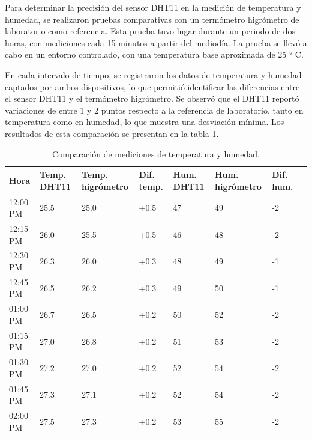 Para determinar la precisión del sensor DHT11 en la medición de temperatura y humedad, se realizaron pruebas comparativas con un termómetro higrómetro de laboratorio como referencia. Esta prueba tuvo lugar durante un periodo de dos horas, con mediciones cada 15 minutos a partir del mediodía. La prueba se llevó a cabo en un entorno controlado, con una temperatura base aproximada de 25 ° C.

En cada intervalo de tiempo, se registraron los datos de temperatura y humedad captados por ambos dispositivos, lo que permitió identificar las diferencias entre el sensor DHT11 y el termómetro higrómetro. Se observó que el DHT11 reportó variaciones de entre 1 y 2 puntos respecto a la referencia de laboratorio, tanto en temperatura como en humedad, lo que muestra una desviación mínima. Los resultados de esta comparación se presentan en la tabla \ref{tab:DHT11_comparacion}.

\vspace{1cm}

\begin{table}[h]
    \centering
    \caption[Comparación de mediciones de temperatura y humedad]{Comparación de mediciones de temperatura y humedad.}
    \begin{tabularx}{\textwidth}{l X X X X X X X}  %
        \toprule
        \textbf{Hora} & \textbf{Temp. DHT11} & \textbf{Temp. higrómetro} & \textbf{Dif. temp.} & \textbf{Hum. DHT11} & \textbf{Hum. higrómetro} & \textbf{Dif. hum.} \\
        \midrule
        12:00 PM & 25.5 & 25.0 & +0.5 & 47 & 49 & -2\\		
        12:15 PM & 26.0 & 25.5 & +0.5 & 46 & 48	& -2\\
        12:30 PM & 26.3 & 26.0 & +0.3 & 48 & 49 & -1\\
        12:45 PM & 26.5 & 26.2 & +0.3 & 49 & 50 & -1\\
        01:00 PM & 26.7 & 26.5 & +0.2 & 50 & 52 & -2\\
        01:15 PM & 27.0 & 26.8 & +0.2 & 51 & 53 & -2\\
        01:30 PM & 27.2 & 27.0 & +0.2 & 52 & 54 & -2\\
        01:45 PM & 27.3 & 27.1 & +0.2 & 52 & 54 & -2\\
        02:00 PM & 27.5 & 27.3 & +0.2 & 53 & 55 & -2\\
        \bottomrule
    \end{tabularx}
    \label{tab:DHT11_comparacion}
\end{table}

